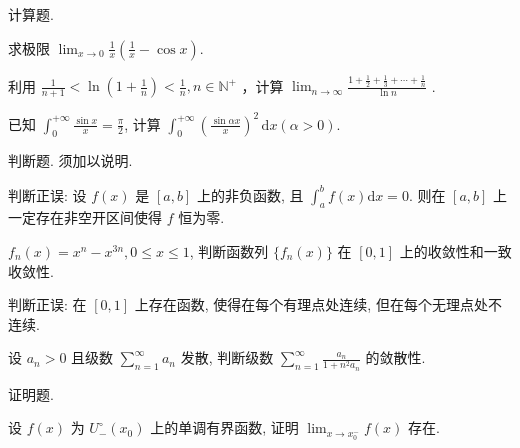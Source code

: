 \par{}
计算题.\par
求极限 $\lim_{x\to 0}\frac{1}{x}\left(\frac{1}{x} -\cos x\right).$\par
利用  $\frac{1}{n+1}<\ln\left(1+\frac{1}{n}\right)<\frac{1}{n}, n\in\mathbb{N}^{+}$ ，计算  $\lim_{n\to\infty}\frac{1+\frac{1}{2}+\frac{1}{3}+\cdots+\frac{1}{n}}{\ln n}$ .\par
已知 $\int_0^{+\infty} \frac{\sin x}{x} = \frac{\pi}{2}$, 计算 $\int_0^{+\infty} \left( \frac{\sin \alpha x}{x} \right)^2 \, \mathrm{d}x (\alpha > 0)$.\par
\par{}
判断题. 须加以说明.\par
判断正误: 设 $f(x)$ 是 $[a, b]$ 上的非负函数, 且 $\int_{a}^{b} f(x) \mathrm{d}x = 0$. 则在 $[a, b]$ 上一定存在非空开区间使得 $f$ 恒为零.\par
$f_{n}(x) = x^{n} - x^{3n}, 0 \leq x \leq 1$, 判断函数列 $\{f_{n}(x)\}$ 在 $[0,1]$ 上的收敛性和一致收敛性.\par
判断正误: 在 $[0,1]$ 上存在函数, 使得在每个有理点处连续, 但在每个无理点处不连续.\par
设 $a_{n} > 0$ 且级数 $\sum_{n=1}^{\infty} a_{n}$ 发散, 判断级数 $\sum_{n=1}^{\infty} \frac{a_{n}}{1 + n^{2} a_{n}}$ 的敛散性.\par
\par{}
证明题.\par
设 $f(x)$ 为 $U_{-}^{\circ}(x_0)$ 上的单调有界函数, 证明 $\lim_{x \to x_0^{-}} f(x)$ 存在.\par
